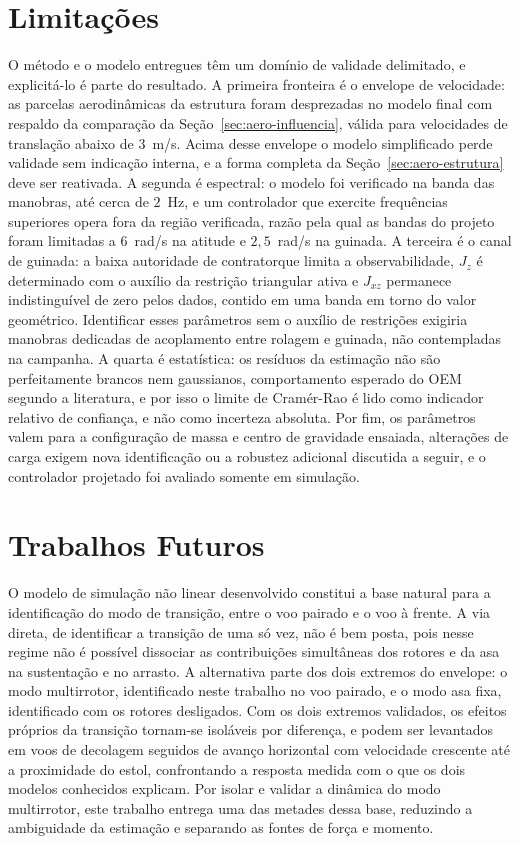 {\color{blue}\section[{\color{blue}Limitações}]{{\color{blue}Limitações}}

O método e o modelo entregues têm um domínio de validade delimitado, e explicitá-lo é parte do resultado. A primeira fronteira é o envelope de velocidade: as parcelas aerodinâmicas da estrutura foram desprezadas no modelo final com respaldo da comparação da Seção~\ref{sec:aero-influencia}, válida para velocidades de translação abaixo de $3$~m/s. Acima desse envelope o modelo simplificado perde validade sem indicação interna, e a forma completa da Seção~\ref{sec:aero-estrutura} deve ser reativada. A segunda é espectral: o modelo foi verificado na banda das manobras, até cerca de $2$~Hz, e um controlador que exercite frequências superiores opera fora da região verificada, razão pela qual as bandas do projeto foram limitadas a $6$~rad/s na atitude e $2{,}5$~rad/s na guinada. A terceira é o canal de guinada: a baixa autoridade de contratorque limita a observabilidade, $J_z$ é determinado com o auxílio da restrição triangular ativa e $J_{xz}$ permanece indistinguível de zero pelos dados, contido em uma banda em torno do valor geométrico. Identificar esses parâmetros sem o auxílio de restrições exigiria manobras dedicadas de acoplamento entre rolagem e guinada, não contempladas na campanha. A quarta é estatística: os resíduos da estimação não são perfeitamente brancos nem gaussianos, comportamento esperado do OEM segundo a literatura, e por isso o limite de Cramér-Rao é lido como indicador relativo de confiança, e não como incerteza absoluta. Por fim, os parâmetros valem para a configuração de massa e centro de gravidade ensaiada, alterações de carga exigem nova identificação ou a robustez adicional discutida a seguir, e o controlador projetado foi avaliado somente em simulação.}

\section{Trabalhos Futuros}

O modelo de simulação não linear desenvolvido constitui a base natural para a identificação do modo de transição{\color{blue}, entre o voo pairado e o voo à frente. A via direta, de identificar a transição de uma só vez, não é bem posta, pois nesse regime não é possível dissociar as contribuições simultâneas dos rotores e da asa na sustentação e no arrasto. A alternativa parte dos dois extremos do envelope: o modo multirrotor, identificado neste trabalho no voo pairado, e o modo asa fixa, identificado com os rotores desligados. Com os dois extremos validados, os efeitos próprios da transição tornam-se isoláveis por diferença, e podem ser levantados em voos de decolagem seguidos de avanço horizontal com velocidade crescente até a proximidade do estol, confrontando a resposta medida com o que os dois modelos conhecidos explicam. Por isolar e validar a dinâmica do modo multirrotor, este trabalho entrega uma das metades dessa base, reduzindo a ambiguidade da estimação e separando as fontes de força e momento.}

